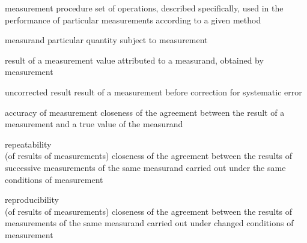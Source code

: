 \documentclass[avery5371,grid]{flashcards}
\begin{document}
\begin{flashcard}[Definition]{measurement procedure}
\vspace{\fill}
    set of operations, described specifically, used in the performance of particular measurements according to a given method
\vspace{\fill}
\end{flashcard}

\begin{flashcard}[Definition]{measurand}
\vspace{\fill}
    particular quantity subject to measurement
\vspace{\fill}
\end{flashcard}

\begin{flashcard}[Definition]{result of a measurement}
\vspace{\fill}
    value attributed to a measurand, obtained by measurement
\vspace{\fill}
\end{flashcard}

\begin{flashcard}[Definition]{uncorrected result}
\vspace{\fill}
    result of a measurement before correction for systematic error
\vspace{\fill}
\end{flashcard}

\begin{flashcard}[Definition]{accuracy of measurement}
\vspace{\fill}
    closeness of the agreement between the result of a measurement and a true value of the measurand
\vspace{\fill}
\end{flashcard}

\begin{flashcard}[Definition]{repeatability \\ (of results of measurements)}
\vspace{\fill}
    closeness of the agreement between the results of successive measurements of the same measurand carried out under the same conditions of measurement
\vspace{\fill}
\end{flashcard}

\begin{flashcard}[Definition]{reproducibility \\ (of results of measurements)}
\vspace{\fill}
    closeness of the agreement between the results of measurements of the same measurand carried out under changed conditions of measurement
\vspace{\fill}
\end{flashcard}
\end{document}
